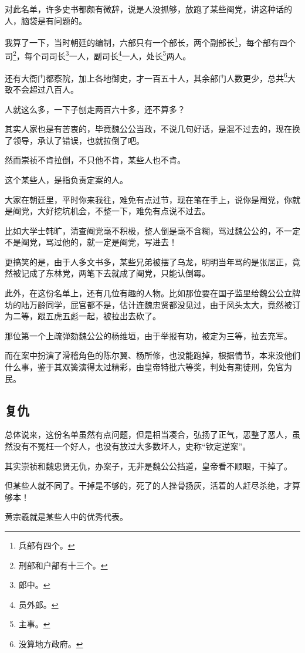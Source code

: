 \begin{multicols}{\theparacolNo}
对此名单，许多史书都颇有微辞，说是人没抓够，放跑了某些阉党，讲这种话的人，脑袋是有问题的。

我算了一下，当时朝廷的编制，六部只有一个部长，两个副部长\footnote{兵部有四个。}，每个部有四个司\footnote{刑部和户部有十三个。}，每个司司长\footnote{郎中。}一人，副司长\footnote{员外郎。}一人，处长\footnote{主事。}两人。

还有大衙门都察院，加上各地御史，才一百五十人，其余部门人数更少，总共\footnote{没算地方政府。}大致不会超过八百人。

人就这么多，一下子刨走两百六十多，还不算多？

其实人家也是有苦衷的，毕竟魏公公当政，不说几句好话，是混不过去的，现在换了领导，承认了错误，也就拉倒了吧。

然而崇祯不肯拉倒，不只他不肯，某些人也不肯。

这个某些人，是指负责定案的人。

大家在朝廷里，平时你来我往，难免有点过节，现在笔在手上，说你是阉党，你就是阉党，大好挖坑机会，不整一下，难免有点说不过去。

比如大学士韩旷，清查阉党毫不积极，整人倒是毫不含糊，骂过魏公公的，不一定不是阉党，骂过他的，就一定是阉党，写进去！

更搞笑的是，由于人多文书多，某些兄弟被摆了乌龙，明明当年骂的是张居正，竟然被记成了东林党，两笔下去就成了阉党，只能认倒霉。

此外，在这份名单上，还有几位有趣的人物。比如那位要在国子监里给魏公公立牌坊的陆万龄同学，屁官都不是，估计连魏忠贤都没见过，由于风头太大，竟然被订为二等，跟五虎五彪一起，被拉出去砍了。

那位第一个上疏弹劾魏公公的杨维垣，由于举报有功，被定为三等，拉去充军。

而在案中扮演了滑稽角色的陈尔翼、杨所修，也没能跑掉，根据情节，本来没他们什么事，鉴于其双簧演得太过精彩，由皇帝特批六等奖，判处有期徒刑，免官为民。

\subsection{复仇}
总体说来，这份名单虽然有点问题，但是相当凑合，弘扬了正气，恶整了恶人，虽然没有不冤枉一个好人，也没有放过大多数坏人，史称“钦定逆案”。

其实崇祯和魏忠贤无仇，办案子，无非是魏公公挡道，皇帝看不顺眼，干掉了。

但某些人就不同了。干掉是不够的，死了的人挫骨扬灰，活着的人赶尽杀绝，才算够本！

黄宗羲就是某些人中的优秀代表。


\end{multicols}
